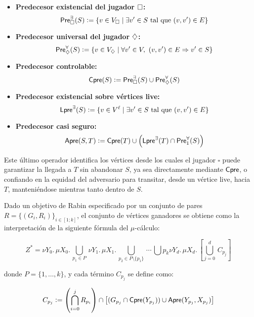 \begin{itemize}
	\item \textbf{Predecesor existencial del jugador \( \square \):}
	      \[
		      \textsf{Pre}_\square^\exists(S) := \{v \in V_\square \mid \exists v' \in S \text{ tal que } (v, v') \in E\}
	      \]

	\item \textbf{Predecesor universal del jugador \( \diamondsuit \):}
	      \[
		      \textsf{Pre}_\diamondsuit^\forall(S) := \{v \in V_\diamondsuit \mid \forall v' \in V,\ (v, v') \in E \Rightarrow v' \in S\}
	      \]

	\item \textbf{Predecesor controlable:}
	      \[
		      \textsf{Cpre}(S) := \textsf{Pre}_\square^\exists(S) \cup \textsf{Pre}_\diamondsuit^\forall(S)
	      \]

	\item \textbf{Predecesor existencial sobre vértices live:}
	      \[
		      \textsf{Lpre}^\exists(S) := \{v \in V^\ell \mid \exists v' \in S \text{ tal que } (v, v') \in E\}
	      \]

	\item \textbf{Predecesor casi seguro:}
	      \[
		      \textsf{Apre}(S, T) := \textsf{Cpre}(T) \cup \left( \textsf{Lpre}^\exists(T) \cap \textsf{Pre}_1^\forall(S) \right)
	      \]
\end{itemize}

Este último operador identifica los vértices desde los cuales el jugador \(
\square \) puede garantizar la llegada a \( T \) sin abandonar \( S \), ya sea
directamente mediante \( \textsf{Cpre} \), o confiando en la equidad del adversario
para transitar, desde un vértice live, hacia \( T \), manteniéndose mientras
tanto dentro de \( S \).

Dado un objetivo de Rabin especificado por un conjunto de pares \( R = \{(G_i,
R_i)\}_{i \in [1;k]} \), el conjunto de vértices ganadores se obtiene como la
interpretación de la siguiente fórmula del $\mu$-cálculo: %

\[
	Z^* = \nu Y_0.\, \mu X_0.\, \bigcup_{p_1 \in P}\, \nu Y_1.\, \mu X_1.\, \bigcup_{p_2 \in P \setminus \{p_1\}}\, \cdots\, \bigcup{p_k} \nu Y_d.\, \mu X_d.\, \left[ \bigcup_{j=0}^d\, C_{p_j} \right]
\]

donde \( P = \{1, \dots, k\} \), y cada término \( C_{p_j} \) se define como:

\[
	C_{p_j} := \left( \bigcap_{i=0}^j R_{p_i} \right) \cap \left[ (G_{p_j} \cap \textsf{Cpre}(Y_{p_j})) \cup \textsf{Apre}(Y_{p_j}, X_{p_j}) \right]
\]

